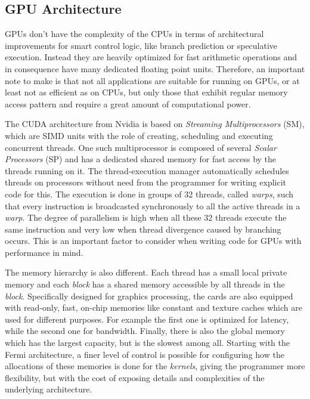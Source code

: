 \subsection{GPU Architecture}

GPUs don't have the complexity of the CPUs in terms of architectural
improvements for smart control logic, like branch prediction or speculative
execution. Instead they are heavily optimized for fast arithmetic operations and
in consequence have many dedicated floating point units. Therefore, an important
note to make is that not all applications are suitable for running on GPUs, or
at least not as efficient as on CPUs, but only those that exhibit regular memory
access pattern and require a great amount of computational power.

The CUDA architecture from Nvidia is based on \textit{Streaming Multiprocessors}
(SM), which are SIMD units with the role of creating, scheduling and executing
concurrent threads. One such multiprocessor is composed of several
\textit{Scalar Processors} (SP) and has a dedicated shared memory for fast
access by the threads running on it. The thread-execution manager automatically
schedules threads on processors without need from the programmer for writing
explicit code for this. The execution is done in groups of 32 threads, called
\textit{warps}, such that every instruction is broadcasted synchronously to all
the active threads in a \textit{warp}. The degree of parallelism is high when
all these 32 threads execute the same instruction and very low when thread
divergence caused by branching occurs. This is an important factor to consider
when writing code for GPUs with performance in mind.

The memory hierarchy is also different. Each thread has a small local private
memory and each \textit{block} has a shared memory accessible by all threads in
the \textit{block}. Specifically designed for graphics processing, the cards are
also equipped with read-only, fast, on-chip memories like constant and texture
caches which are used for different purposes. For example the first one is
optimized for latency, while the second one for bandwidth. Finally, there is
also the global memory which has the largest capacity, but is the slowest among
all. Starting with the Fermi architecture, a finer level of control is possible
for configuring how the allocations of these memories is done for the
\textit{kernels}, giving the programmer more flexibility, but with the cost of
exposing details and complexities of the underlying architecture.

